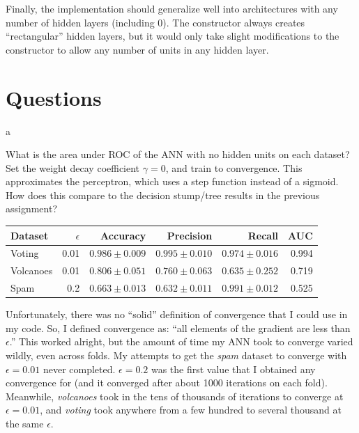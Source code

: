 \documentclass[fleqn]{homework}
\begin{document}
  Finally, the implementation should generalize well into architectures with any
  number of hidden layers (including 0).  The constructor always creates
  ``rectangular'' hidden layers, but it would only take slight modifications to
  the constructor to allow any number of units in any hidden layer.

  \section{Questions}

  \begin{problem}{a}
    \begin{question}
      What is the area under ROC of the ANN with no hidden units on each
      dataset? Set the weight decay coefficient $\gamma = 0$, and train to
      convergence. This approximates the perceptron, which uses a step function
      instead of a sigmoid. How does this compare to the decision stump/tree
      results in the previous assignment?
    \end{question}

    \begin{tabular}{|lr|rrrr|}
      \hline
      Dataset & $\epsilon$ & Accuracy & Precision & Recall & AUC \\
      \hline
      Voting & 0.01 & $0.986 \pm 0.009$ & $0.995 \pm 0.010$ & $0.974 \pm 0.016$ & 0.994 \\
      Volcanoes & 0.01 & $0.806 \pm 0.051$ & $0.760 \pm 0.063$ & $0.635 \pm 0.252$ & 0.719\\
      Spam & 0.2 & $0.663 \pm 0.013$ & $0.632 \pm 0.011$ & $0.991 \pm 0.012$ & 0.525 \\
      \hline
    \end{tabular}

    \vspace{4mm}

    Unfortunately, there was no ``solid'' definition of convergence that I could
    use in my code.  So, I defined convergence as: ``all elements of the
    gradient are less than $\epsilon$.''  This worked alright, but the amount of
    time my ANN took to converge varied wildly, even across folds.  My attempts
    to get the \textit{spam} dataset to converge with $\epsilon=0.01$ never
    completed.  $\epsilon = 0.2$ was the first value that I obtained any
    convergence for (and it converged after about 1000 iterations on each fold).
    Meanwhile, \textit{volcanoes} took in the tens of thousands of iterations to
    converge at $\epsilon = 0.01$, and \textit{voting} took anywhere from a few
    hundred to several thousand at the same $\epsilon$.
  \end{problem}
\end{document}
